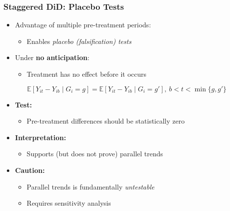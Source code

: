 \documentclass[12pt, compress]{beamer}
\begin{document}
\begin{frame}
	\frametitle{Staggered DiD: Placebo Tests}

\begin{itemize}
	\item Advantage of multiple pre-treatment periods:
	\begin{itemize}
		\item Enables \textit{placebo (falsification) tests}
	\end{itemize}
	
	\medskip
	
	\item Under \textbf{no anticipation}:
	\begin{itemize}
		\item Treatment has no effect before it occurs
	\end{itemize}
\end{itemize}
\[
\mathbb{E}\!\left[Y_{it} - Y_{ib} \mid G_i = g\right]
=
\mathbb{E}\!\left[Y_{it} - Y_{ib} \mid G_i = g'\right],
\ b < t < \min\{g,g'\}
\]

\begin{itemize}
	\item \textbf{Test:}
	\begin{itemize}
		\item Pre-treatment differences should be statistically zero
	\end{itemize}
	
	\medskip
	
	\item \textbf{Interpretation:}
	\begin{itemize}
		\item Supports (but does not prove) parallel trends
	\end{itemize}
	
	\medskip
	
	\item \textbf{Caution:}
	\begin{itemize}
		\item Parallel trends is fundamentally \textit{untestable}
		\item Requires sensitivity analysis
	\end{itemize}
\end{itemize}

\end{frame}
\end{document}
